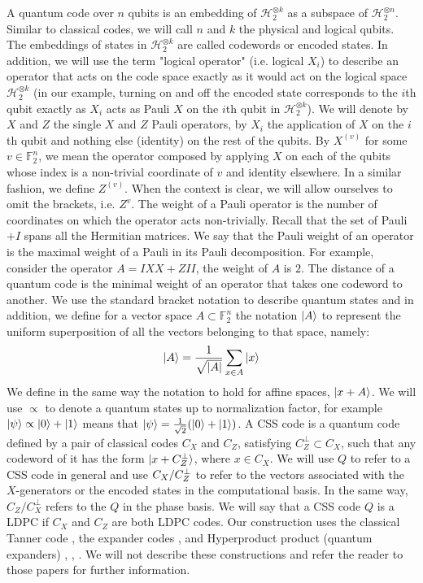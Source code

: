 A quantum code over $n$ qubits is an embedding of $\mathcal{H}_{2}^{\otimes k}$ as a subspace of $\mathcal{H}_{2}^{\otimes n}$. Similar to classical codes, we will call $n$ and $k$ the physical and logical qubits. The embeddings of states in $\mathcal{H}_{2}^{\otimes k}$ are called codewords or encoded states. In addition, we will use the term "logical operator" (i.e. logical $X_{i}$) to describe an operator that acts on the code space exactly as it would act on the logical space $\mathcal{H}_{2}^{\otimes k}$ (in our example, turning on and off the encoded state corresponds to the $i$th qubit exactly as $X_{i}$ acts as Pauli $X$ on the $i$th qubit in $\mathcal{H}_{2}^{\otimes k}$). We will denote by $X$ and $Z$ the single $X$ and $Z$ Pauli operators, by $X_{i}$ the application of $X$ on the $i$th qubit and nothing else (identity) on the rest of the qubits. By $X^{(v)}$ for some $v \in \mathbb{F}_{2}^{n}$, we mean the operator composed by applying $X$ on each of the qubits whose index is a non-trivial coordinate of $v$ and identity elsewhere. In a similar fashion, we define $Z^{(v)}$. When the context is clear, we will allow ourselves to omit the brackets, i.e. $Z^{v}$. The weight of a Pauli operator is the number of coordinates on which the operator acts non-trivially. Recall that the set of Pauli $+ I$ spans all the Hermitian matrices. We say that the Pauli weight of an operator is the maximal weight of a Pauli in its Pauli decomposition. For example, consider the operator $A = IXX + ZII$, the weight of $A$ is $2$. The distance of a quantum code is the minimal weight of an operator that takes one codeword to another. We use the standard bracket notation to describe quantum states and in addition, we define for a vector space $A \subset \mathbb{F}_{2}^{n}$ the notation $\ket{A}$ to represent the uniform superposition of all the vectors belonging to that space, namely: \begin{equation*}
  \begin{split}
\ket{A} = \frac{1}{\sqrt{|A|}}\sum_{x \in A}{\ket{x}}
  \end{split}
\end{equation*}
We define in the same way the notation to hold for affine spaces, $\ket{x +A}$. We will use $\propto$ to denote a quantum states up to normalization factor, for example $\ket{\psi} \propto \ket{0} + \ket{1}$ means that $\ket{\psi} = \frac{1}{\sqrt{2}}(\ket{0} + \ket{1})$.
A CSS code is a quantum code defined by a pair of classical codes $C_{X}$ and $C_{Z}$, satisfying $C_{Z}^{\perp} \subset C_{X}$, such that any codeword of it has the form $\ket{x + C_{Z}^\perp}$, where $x \in C_{X}$. We will use $Q$ to refer to a CSS code in general and use $C_{X}/C_{Z}^\perp$ to refer to the vectors associated with the $X$-generators or the encoded states in the computational basis. In the same way, $C_{Z}/C_{X}^{\perp}$ refers to the $Q$ in the phase basis. We will say that a CSS code $Q$ is a LDPC if $C_{X}$ and $C_{Z}$ are both LDPC codes. Our construction uses the classical Tanner code \cite{Tanner}, the expander codes \cite{ExpanderCodes}, and Hyperproduct product (quantum expanders) \cite{Leverrier_2015}, \cite{Tillich_2014}, \cite{overheadofquantumerrorcorrection}. We will not describe these constructions and refer the reader to those papers for further information.


